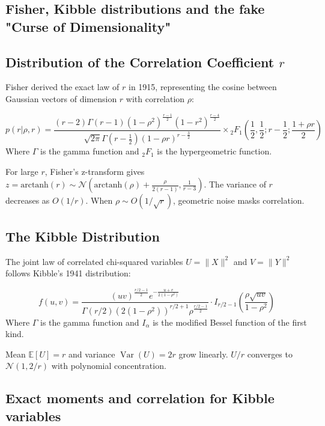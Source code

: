 \documentclass[11pt, a4paper]{article}
\newcommand{\E}{\mathbb{E}}
\DeclareMathOperator{\Var}{Var}
\begin{document}
\begin{center}

\newpage
\section{Fisher, Kibble distributions and the fake "Curse of Dimensionality"}

\subsection{Distribution of the Correlation Coefficient $r$}
Fisher derived the exact law of $r$ in 1915, representing the cosine between Gaussian vectors of dimension $r$ with correlation $\rho$:

\[
p(r|\rho, r) = \frac{(r-2)\Gamma(r-1)(1-\rho^2)^{\frac{r-1}{2}}(1-r^2)^{\frac{r-4}{2}}}{\sqrt{2\pi}\Gamma(r-\frac{1}{2})(1-\rho r)^{r-\frac{3}{2}}} \times {}_2F_1\left(\frac{1}{2}, \frac{1}{2}; r-\frac{1}{2}; \frac{1+\rho r}{2}\right)
\]
Where $\Gamma$ is the gamma function and ${}_2F_1$ is the hypergeometric function.

For large $r$, Fisher's z-transform gives $z = \text{arctanh}(r) \sim \mathcal{N}\left(\text{arctanh}(\rho) + \frac{\rho}{2(r-1)}, \frac{1}{r-3}\right)$. The variance of $r$ decreases as $O(1/r)$. When $\rho \sim O(1/\sqrt{r})$, geometric noise masks correlation.

\subsection{The Kibble Distribution}
The joint law of correlated chi-squared variables $U=\|X\|^2$ and $V=\|Y\|^2$ follows Kibble's 1941 distribution:

\[
f(u, v) = \frac{(uv)^{\frac{r/2-1}{2}} e^{-\frac{u+v}{2(1-\rho^2)}}}{\Gamma(r/2) (2(1-\rho^2))^{r/2+1} \rho^{\frac{r/2-1}{2}}} \cdot I_{r/2-1}\left(\frac{\rho\sqrt{uv}}{1-\rho^2}\right)
\]
Where $\Gamma$ is the gamma function and $I_\alpha$ is the modified Bessel function of the first kind.

Mean $\E[U] = r$ and variance $\Var(U) = 2r$ grow linearly. $U/r$ converges to $\mathcal{N}(1, 2/r)$ with polynomial concentration.


\subsection{Exact moments and correlation for Kibble variables}


\end{center}
\end{document}
